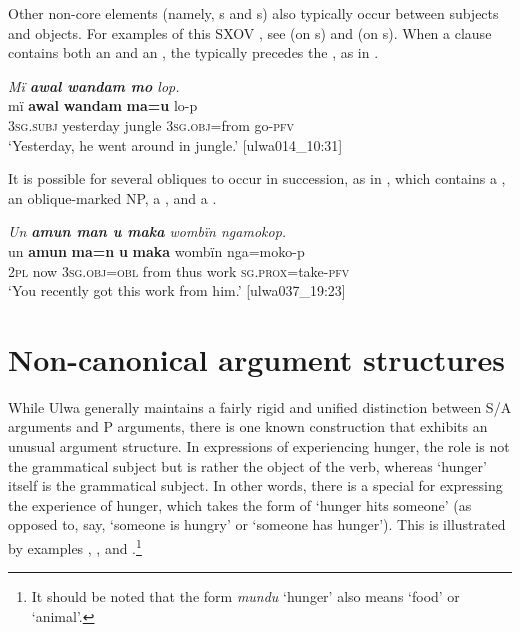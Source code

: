 
Other non-core elements (namely, s and s) also typically occur between subjects and objects. For examples of this SXOV , see  (on s) and  (on s). When a clause contains both an  and an , the  typically precedes the , as in .

\ea%
    \label{ex:clause:84}
          \textit{Mï \textbf{awal wandam mo} lop.}\\
\gll    mï      \textbf{awal}    \textbf{wandam}  \textbf{ma=u}      lo-p\\
    3\textsc{sg.subj}  yesterday  jungle    3\textsc{sg.obj}=from  go\textsc{{}-pfv}\\
\glt `Yesterday, he went around in jungle.’ [ulwa014\_10:31]
\z

It is possible for several obliques to occur in succession, as in , which contains a , an oblique-marked NP, a , and a .


\ea\label{ex:clause:85}
    \textit{Un \textbf{amun man u maka} wombïn ngamokop.}\\
\gll    un  \textbf{amun}  \textbf{ma=n}      \textbf{u}    \textbf{maka}  wombïn     nga=moko-p\\
    2\textsc{pl}  now  3\textsc{sg.obj=obl}  from  thus  work    \textsc{sg.prox}=take\textsc{{}-pfv}\\
\glt `You recently got this work from him.’ [ulwa037\_19:23]
\z


\section{Non-canonical argument structures}\label{sec:11.5}


While Ulwa generally maintains a fairly rigid and unified distinction between S/A arguments and P arguments, there is one known construction that exhibits an unusual argument structure. In expressions of experiencing hunger, the  role is not the grammatical subject but is rather the object of the verb, whereas ‘hunger’ itself is the grammatical subject. In other words, there is a special  for expressing the experience of hunger, which takes the form of ‘hunger hits someone’ (as opposed to, say, ‘someone is hungry’ or ‘someone has hunger’). This is illustrated by examples , , and .\footnote{It should be noted that the form \textit{mundu} ‘hunger’ also means ‘food’ or ‘animal’.}

